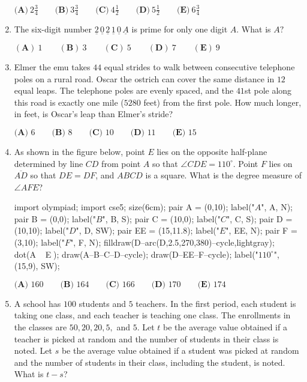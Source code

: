\documentclass{article}
\begin{document}
\begin{enumerate}[label=\arabic*., itemsep=0.5em]
$\textbf{(A)}\ 2 \frac{3}{4}  \qquad\textbf{(B)}\  3 \frac{3}{4} \qquad\textbf{(C)}\  4 \frac{1}{2} \qquad\textbf{(D)}\
 5 \frac{1}{2} \qquad\textbf{(E)}\ 6 \frac{3}{4}$\par \vspace{0.5em}\item The six-digit number $\underline{2}\,\underline{0}\,\underline{2}\,\underline{1}\,\underline{0}\,\underline{A}$ is prime for only one digit $A.$ What is $A?$

$(\textbf{A})\: 1\qquad(\textbf{B}) \: 3\qquad(\textbf{C}) \: 5 \qquad(\textbf{D}) \: 7\qquad(\textbf{E}) \: 9$\par \vspace{0.5em}\item Elmer the emu takes $44$ equal strides to walk between consecutive telephone poles on a rural road. Oscar the ostrich can cover the same distance in $12$ equal leaps. The telephone poles are evenly spaced, and the $41$st pole along this road is exactly one mile ($5280$ feet) from the first pole. How much longer, in feet, is Oscar's leap than Elmer's stride?

$\textbf{(A) }6\qquad\textbf{(B) }8\qquad\textbf{(C) }10\qquad\textbf{(D) }11\qquad\textbf{(E) }15$\par \vspace{0.5em}\item As shown in the figure below, point $E$ lies on the opposite half-plane determined by line $CD$ from point $A$ so that $\angle CDE = 110^\circ$. Point $F$ lies on $\overline{AD}$ so that $DE=DF$, and $ABCD$ is a square. What is the degree measure of $\angle AFE$?


\begin{center}
\begin{asy}
import olympiad;
import cse5;
size(6cm);
pair A = (0,10);
label("$A$", A, N);
pair B = (0,0);
label("$B$", B, S);
pair C = (10,0);
label("$C$", C, S);
pair D = (10,10);
label("$D$", D, SW);
pair EE = (15,11.8);
label("$E$", EE, N);
pair F = (3,10);
label("$F$", F, N);
filldraw(D--arc(D,2.5,270,380)--cycle,lightgray);
dot(A^^B^^C^^D^^EE^^F);
draw(A--B--C--D--cycle);
draw(D--EE--F--cycle);
label("$110^\circ$", (15,9), SW);
\end{asy}
\end{center}


$\textbf{(A) }160\qquad\textbf{(B) }164\qquad\textbf{(C) }166\qquad\textbf{(D) }170\qquad\textbf{(E) }174$\par \vspace{0.5em}\item A school has $100$ students and $5$ teachers. In the first period, each student is taking one class, and each teacher is teaching one class. The enrollments in the classes are $50, 20, 20, 5, $ and $5$. Let $t$ be the average value obtained if a teacher is picked at random and the number of students in their class is noted. Let $s$ be the average value obtained if a student was picked at random and the number of students in their class, including the student, is noted. What is $t-s$?


\end{enumerate}
\end{document}
